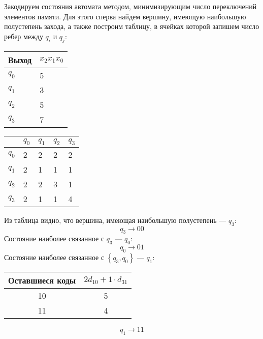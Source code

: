 Закодируем состояния автомата методом, минимизирующим число переключений элементов
памяти. Для этого сперва найдем вершину, имеющую наибольшую полустепень
захода, а также построим таблицу, в ячейках которой запишем число ребер между
$q_i$ и $q_j$:
\begin{table}[H]
\centering
\begin{tabular}{|M|M|}
    \hline
    Выход & $x_2x_1x_0$ \\
    \hline
    $q_0$ & 5 \\
    \hline
    $q_1$ & 3 \\
    \hline
    $q_2$ & 5 \\
    \hline
    $q_3$ & 7 \\
    \hline
\end{tabular}
\hfill
\begin{tabular}{|M|M|M|M|M|}
    \hline
          & $q_0$ & $q_1$ & $q_2$ & $q_3$ \\
    \hline
    $q_0$ &   2   &   2   &   2   &   2   \\
    \hline
    $q_1$ &   2   &   1   &   1   &   1   \\
    \hline
    $q_2$ &   2   &   2   &   3   &   1   \\
    \hline
    $q_3$ &   2   &   1   &   1   &   4   \\
    \hline
\end{tabular}
\end{table}

Из таблица видно, что вершина, имеющая наибольшую полустепень --- $q_3$:
\[
    q_3 \to 00
\]
Состояние наиболее связанное с $q_3$ --- $q_0$:
\[
    q_0 \to 01
\]
Состояние наиболее связанное с $\left\{ q_3, q_0\right\}$ --- $q_1$:

\vspace{-1cm}%
\begin{minipage}[t]{0.58\textwidth}
    \begin{table}[H]
        \centering
        \begin{tabularx}{\textwidth}{|C|C|}
            \hline
            Оставшиеся коды & $2d_{10} + 1\cdot d_{31}$ \\
             & 5 \\
             & 4 \\
            \hline
        \end{tabularx}
    \end{table}
\end{minipage}
\begin{minipage}[t]{0.38\textwidth}
    \vspace{1cm}
    \[
        q_1 \to 11
    \]
\end{minipage}

